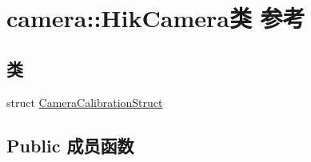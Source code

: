 \hypertarget{classcamera_1_1_hik_camera}{}\section{camera\+:\+:Hik\+Camera类 参考}
\label{classcamera_1_1_hik_camera}
\subsection*{类}
\begin{DoxyCompactItemize}
\item 
struct \hyperlink{structcamera_1_1_hik_camera_1_1_camera_calibration_struct}{Camera\+Calibration\+Struct}
\end{DoxyCompactItemize}
\subsection*{Public 成员函数}

